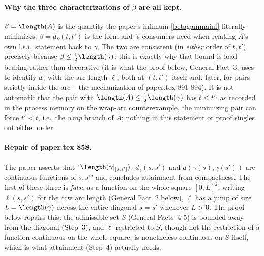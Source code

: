 \begin{lemma}
  \paragraph{Why the three characterizations of $\beta$ are all kept.} $\beta = \length(A)$ is the
  quantity the paper's infimum \eqref{betagammainf} literally minimizes; $\beta = d_\gamma(t,t')$ is
  the form  and 's consumers need when relating
  $A$'s own l.s.i.\ statement back to $\gamma$. The two are consistent (in \emph{either} order of
  $t,t'$) precisely because $\beta \le \tfrac12\length(\gamma)$: this is exactly why that bound is
  load-bearing rather than decorative (it is what the proof below, General Fact~3, uses to identify
  $d_\gamma$ with the arc length $\ell$, both at $(t,t')$ itself and, later, for pairs strictly
  inside the arc -- the mechanization of paper.tex 891-894). It is not automatic that the pair with
  $\length(A)\le\tfrac12\length(\gamma)$ has $t\le t'$: as recorded in the process memory on the
  wrap-arc counterexample, the minimizing pair can force $t' < t$, i.e.\ the \emph{wrap} branch of
  $A$; nothing in this statement or proof singles out either order.

  \paragraph{Repair of paper.tex 858.} The paper asserts that "$\length(\gamma|_{[s,s']})$,
  $d_\gamma(s,s')$ and $d(\gamma(s),\gamma(s'))$ are continuous functions of $s,s'$" and concludes
  attainment from compactness. The first of these three is \emph{false} as a function on the whole
  square $[0,L]^2$: writing $\ell(s,s')$ for the ccw arc length (General Fact~2 below), $\ell$ has a
  jump of size $L=\length(\gamma)$ across the entire diagonal $s=s'$ whenever $L>0$. The proof below
  repairs this: the admissible set $S$ (General Facts~4-5) is bounded away from the diagonal
  (Step~3), and $\ell$ restricted to $S$, though not the restriction of a function continuous on the
  whole square, is nonetheless continuous on $S$ itself, which is what attainment (Step~4) actually
  needs.


\end{lemma}
